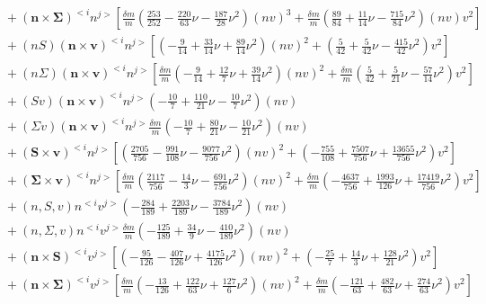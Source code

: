 {\begin{eqnarray}
&&\qquad + (\mathbf{n}\times\mathbf{\Sigma})^{<i} n^{j>}\left[\frac{\delta m}{m}\left(\frac{253}{252} -\frac{220}{63} \nu -\frac{187}{28} \nu^2\right) (nv)^3+\frac{\delta m}{m}\left(\frac{89}{84} + \frac{11}{14} \nu -\frac{715}{84} \nu^2\right) (nv) v^{2}\right] \nonumber \\ 
&&\qquad + (nS) (\mathbf{n}\times\mathbf{v})^{<i} n^{j>}\left[\left(-\frac{9}{14} + \frac{33}{14} \nu + \frac{89}{14} \nu^2\right) (nv)^2+\left(\frac{5}{42} + \frac{5}{42} \nu -\frac{415}{42} \nu^2\right) v^{2}\right] \nonumber \\ 
&&\qquad + (n\Sigma ) (\mathbf{n}\times\mathbf{v})^{<i} n^{j>}\left[\frac{\delta m}{m}\left(-\frac{9}{14} + \frac{12}{7} \nu + \frac{39}{14} \nu^2\right) (nv)^2+\frac{\delta m}{m}\left(\frac{5}{42} + \frac{5}{21} \nu -\frac{57}{14} \nu^2\right) v^{2}\right] \nonumber \\ 
&&\qquad + (Sv) (\mathbf{n}\times\mathbf{v})^{<i} n^{j>}\left(-\frac{10}{7} + \frac{110}{21} \nu -\frac{10}{7} \nu^2\right) (nv) \nonumber \\ 
&&\qquad + (\Sigma v) (\mathbf{n}\times\mathbf{v})^{<i} n^{j>}\frac{\delta m}{m}\left(-\frac{10}{7} + \frac{80}{21} \nu -\frac{10}{21} \nu^2\right) (nv) \nonumber \\ 
&&\qquad + (\mathbf{S}\times\mathbf{v})^{<i} n^{j>}\left[\left(\frac{2705}{756} -\frac{991}{108} \nu -\frac{9077}{756} \nu^2\right) (nv)^2+\left(-\frac{755}{108} + \frac{7507}{756} \nu + \frac{13655}{756} \nu^2\right) v^{2}\right] \nonumber \\ 
&&\qquad + (\mathbf{\Sigma}\times\mathbf{v})^{<i} n^{j>}\left[\frac{\delta m}{m}\left(\frac{2117}{756} -\frac{14}{3} \nu -\frac{691}{756} \nu^2\right) (nv)^2+\frac{\delta m}{m}\left(-\frac{4637}{756} + \frac{1993}{126} \nu + \frac{17419}{756} \nu^2\right) v^{2}\right] \nonumber \\ 
&&\qquad + (n,S,v) n^{<i} v^{j>}\left(-\frac{284}{189} + \frac{2203}{189} \nu -\frac{3784}{189} \nu^2\right) (nv) \nonumber \\ 
&&\qquad + (n,\Sigma ,v) n^{<i} v^{j>}\frac{\delta m}{m}\left(-\frac{125}{189} + \frac{34}{9} \nu -\frac{410}{189} \nu^2\right) (nv) \nonumber \\ 
&&\qquad + (\mathbf{n}\times\mathbf{S})^{<i} v^{j>}\left[\left(-\frac{95}{126} -\frac{407}{126} \nu + \frac{4175}{126} \nu^2\right) (nv)^2+\left(-\frac{25}{7} + \frac{14}{3} \nu + \frac{128}{21} \nu^2\right) v^{2}\right] \nonumber \\ 
&&\qquad + (\mathbf{n}\times\mathbf{\Sigma})^{<i} v^{j>}\left[\frac{\delta m}{m}\left(-\frac{13}{126} + \frac{122}{63} \nu + \frac{127}{6} \nu^2\right) (nv)^2+\frac{\delta m}{m}\left(-\frac{121}{63} + \frac{482}{63} \nu + \frac{274}{63} \nu^2\right) v^{2}\right] \nonumber \\ 

\end{eqnarray}}
